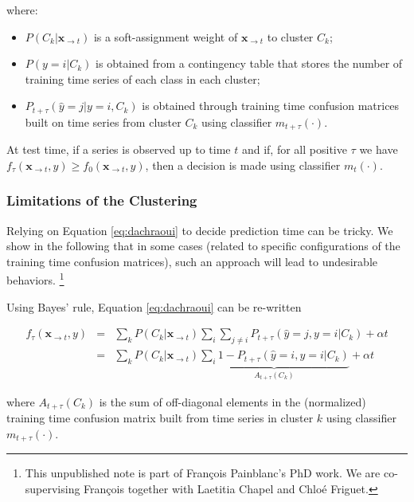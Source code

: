 where:

\begin{itemize}
\item $P(C_k | \mathbf{x}_{\rightarrow t})$ is a soft-assignment weight of
$\mathbf{x}_{\rightarrow t}$ to cluster $C_k$;
\item $P(y=i | C_k)$ is obtained from a contingency table that stores the number of
training time series of each class in each cluster;
\item $P_{t+\tau}(\hat{y} = j | y=i, C_k)$ is obtained through training time
confusion matrices built on time series from cluster $C_k$ using classifier
$m_{t+\tau}(\cdot)$.
\end{itemize}

At test time, if a series is observed up to time $t$ and if, for all positive
$\tau$ we have
$f_\tau(\mathbf{x}_{\rightarrow t}, y) \geq f_0(\mathbf{x}_{\rightarrow t}, y)$,
then a decision is made using classifier $m_t(\cdot)$.

\subsubsection{Limitations of the Clustering}

Relying on Equation \eqref{eq:dachraoui} to decide prediction time can be
tricky. We show in the following that in some cases (related to specific
configurations of the training time confusion matrices), such an approach will
lead to undesirable behaviors.%
\footnote{This unpublished note is part of François Painblanc's PhD work.
We are co-supervising François together with Laetitia Chapel and Chloé Friguet.}

Using Bayes' rule, Equation \eqref{eq:dachraoui} can be re-written

\begin{eqnarray}
    f_\tau(\mathbf{x}_{\rightarrow t}, y) &=&
        \sum_k P(C_k | \mathbf{x}_{\rightarrow t})
        \sum_i
        \sum_{j \neq i} P_{t+\tau}(\hat{y} = j, y=i | C_k)
        + \alpha t \\
    &=&
        \sum_k P(C_k | \mathbf{x}_{\rightarrow t})
        \underbrace{\sum_i 1 - P_{t+\tau}(\hat{y} = i, y=i | C_k)}_{A_{t+\tau}(C_k)}
        + \alpha t
\end{eqnarray}

\noindent
where $A_{t+\tau}(C_k)$ is the sum of off-diagonal elements in the (normalized)
training time confusion matrix built from time series in cluster $k$ using
classifier $m_{t+\tau}(\cdot)$.

